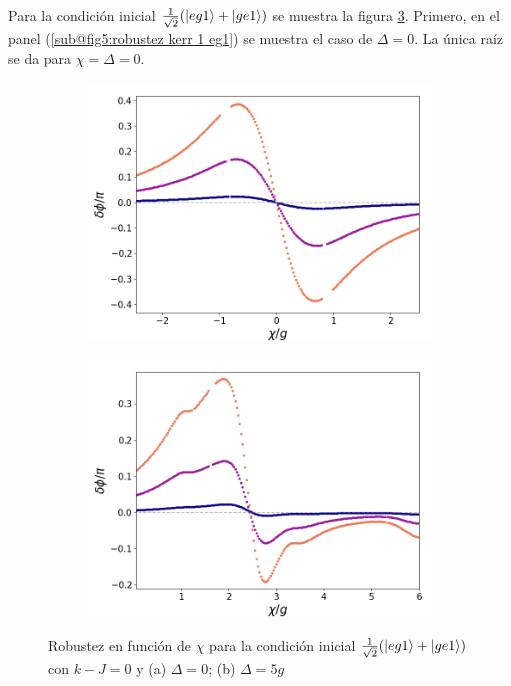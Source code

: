 Para la condición inicial $\frac{1}{\sqrt{2}}(\ket{eg1}+\ket{ge1})$ se muestra la figura \ref{fig5:robustez kerr eg1}. Primero, en el panel (\ref{sub@fig5:robustez kerr 1 eg1}) se muestra el caso de $\Delta=0$. La única raíz se da para $\chi=\Delta=0$.

\begin{figure}[h]
    \centering
    \begin{subfigure}{0.49\textwidth}
        \includegraphics[width=\textwidth]{figuras/ch5/robustez/chi/eg1+ge1 chi zoom.png}
        \caption{}
        \label{fig5:robustez kerr 1 eg1}
    \end{subfigure}
    \hfill
    \begin{subfigure}{0.49\textwidth}
        \includegraphics[width=\textwidth]{figuras/ch5/robustez/chi/eg1+ge1 chi d=5.0g.png}
        \caption{}
        \label{fig5:robustez kerr 2 eg1}
    \end{subfigure}
    \caption{Robustez en función de $\chi$ para la condición inicial $\frac{1}{\sqrt{2}}(\ket{eg1}+\ket{ge1})$ con $k-J=0$ y (a) $\Delta=0$; (b) $\Delta=5g$}
    \label{fig5:robustez kerr eg1}
\end{figure}

